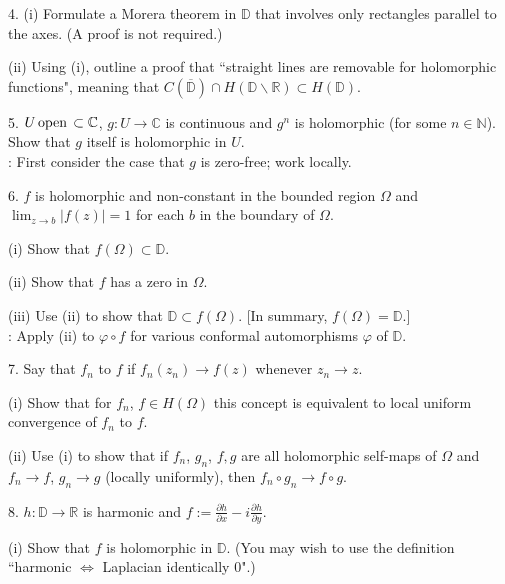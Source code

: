 \documentclass[12pt]{article}
\def\ds{\displaystyle}
\def\D{{\mathbb D} }
\def\C{{\mathbb C} }
\def\N{{\mathbb N} }
\def\R{{\mathbb R} }
\def\open{{\hbox{\,open\,}}}
\begin{document}
\begin{description}
\item 4. (i)
Formulate a Morera theorem in $\D$ that involves only rectangles parallel to
the axes. (A proof is not required.)

\item\quad (ii)
Using (i), outline a proof that ``straight lines are removable for
holomorphic functions", meaning that
$C(\overline{\D})\cap H(\D\backslash \R)\subset H(\D)$.


\item 5.
$U \open\subset \C$, $g:U\to\C$ is continuous and $g^n$ is
holomorphic (for some $n\in\N$). Show that $g$ itself is holomorphic in $U$.
\\
: First consider the case that $g$ is zero-free; work locally.



\item 6.
$f$ is holomorphic and non-constant in the bounded region $\Omega$ and
$\lim_{z\to b}|f(z)|=1$ for each $b$ in the boundary of $\Omega$.

\item\quad (i)
Show that $f(\Omega)\subset \D$.

\item\quad (ii)
Show that $f$ has a zero in $\Omega$.

\item\quad (iii)
Use (ii) to show that $\D\subset f(\Omega)$.
[In summary, $f(\Omega)=\D$.]
\\
: Apply (ii) to $\varphi\circ f$ for various
conformal automorphisms $\varphi$ of $\D$.

\item 7.
Say that $f_n$  
to $f$ if $f_n(z_n)\to f(z)$ whenever $z_n\to z$.

\item\quad (i)
Show that for $f_n$, $f\in H(\Omega)$ this concept is equivalent to local
uniform convergence of $f_n$ to $f$.

\item\quad (ii)
Use (i) to show that if $f_n$, $g_n$, $f,g$ are all holomorphic self-maps
of $\Omega$ and $f_n\to f$, $g_n\to g$ (locally uniformly),
then $f_n\circ g_n\to f\circ g$.


\item 8.
$h:\D\to\R$ is harmonic and
$f:=\ds\frac{\partial h}{\partial x}-i\frac{\partial h}{\partial y}$.

\item\quad (i)
Show that $f$ is holomorphic in $\D$.
(You may wish to use the definition ``harmonic $\Leftrightarrow$
Laplacian identically $0$".)


\end{description}
\end{document}
